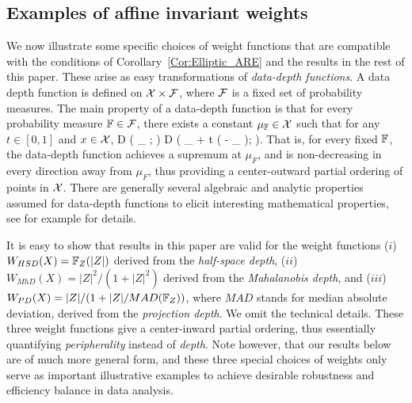 \subsection{Examples of affine invariant weights}

We now illustrate some specific choices of weight functions that are compatible with the 
conditions of Corollary~\ref{Cor:Elliptic_ARE} and the results in the rest of this paper.
 These arise as easy transformations 
of \textit{data-depth functions}. A data depth function 
is defined on $\mathcal{X} \times \mathcal{F}$, where $\mathcal{F}$ is  a fixed set of probability measures.
The main property of a data-depth function is that for every probability measure 
${\mathbb{F}} \in \mathcal{F}$, there exists a constant 
$\mu_{{\mathbb{F}}} \in  \mathcal{X}$ such that for any $t \in [ 0, 1]$ and $x \in \mathcal{X}$,
\baq 
D ( \mu_{\BF} ; \BF ) \geq D ( \mu_{\BF} + t ( \bfx - \mu_{\BF} ); \BF ). 
\label{eq:Peripherality}
\eaq
That is, for every fixed ${\mathbb{F}}$, the data-depth function achieves a supremum at 
$\mu_{F}$, and is non-decreasing in every direction away from $\mu_{F}$, thus providing 
a  center-outward partial ordering of points in $\mathcal{X}$. There are generally several 
algebraic and analytic properties assumed for data-depth functions to elicit interesting 
mathematical properties, see for example \cite{ref:DIMACS061_Serfling, ref:AoS00461_ZuoSerfling} for details.

It is easy to show that results in this paper are valid for the weight functions
($i$) $W_{HSD} (X) = {\mathbb{F}}_{Z} (| Z |)$ derived from the \textit{half-space depth},  
($ii$) $W_{MhD} (X) = |Z|^{2}/(1 + | Z |^2)$ derived from the \textit{Mahalanobis depth}, 
and  
($iii$) $W_{PD} (X) = |Z|/(1+ | Z |/MAD({\mathbb{F}}_{Z}))$, where $MAD$ stands for median 
absolute deviation, derived from the \textit{projection depth}. We omit the technical 
details. These three weight functions give a center-inward partial ordering, thus essentially 
quantifying \textit{peripherality} instead of \textit{depth}.
Note however, that our results below are of much more general form, and 
these three special choices of weights only serve as important illustrative examples 
to achieve desirable robustness and efficiency balance in data analysis.


